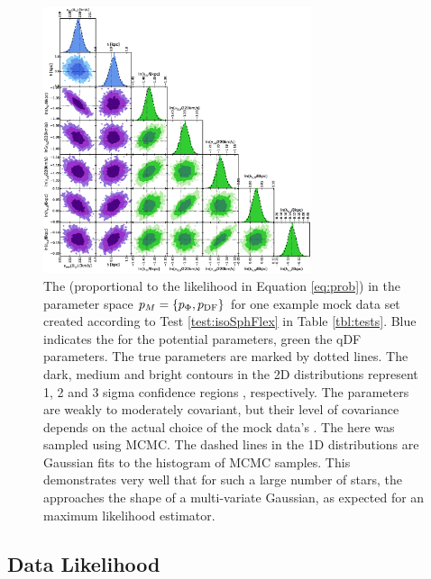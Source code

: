 \begin{figure}[!htbp]
\centering
\includegraphics[width=0.7\textwidth]{figs/isoSphFlex_short_hot_2kpc_triangle_MCMC.eps}
\caption{The \pdf{} (proportional to the likelihood in Equation \ref{eq:prob}) in the parameter space $p_M{} = \{p_\Phi,p_\text{DF}\}$ for one example mock data set created according to Test \ref{test:isoSphFlex} in Table \ref{tbl:tests}. Blue indicates the \pdf{} for the potential parameters, green the qDF parameters. The true parameters are marked by dotted lines. The dark, medium and bright contours in the 2D distributions represent 1, 2 and 3 sigma confidence regions , respectively. The parameters are weakly to moderately covariant, but their level of covariance depends on the actual choice of the mock data's \pmodel{}. The \pdf{} here was sampled using MCMC. The dashed lines in the 1D distributions are Gaussian fits to the histogram of MCMC samples. This demonstrates very well that for such a large number of stars, the \pdf{} approaches the shape of a multi-variate Gaussian, as expected for an maximum likelihood estimator.}
\label{fig:isoSphFlex_triangleplot}
\end{figure}



\subsection{Data Likelihood} \label{sec:likelihood}


